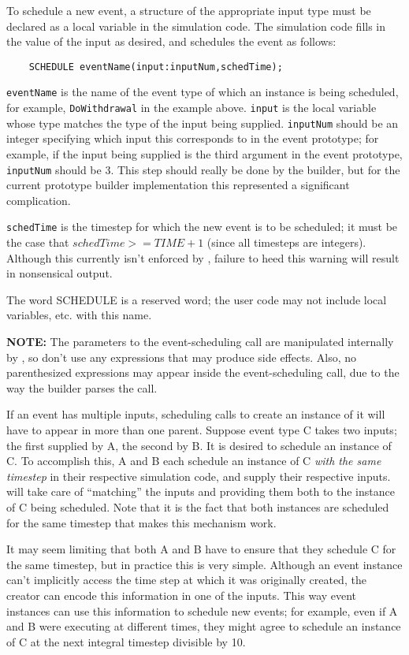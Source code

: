 To schedule a new event, a structure of the appropriate input type must
be declared as a local variable in the simulation code.  The simulation
code fills in the value of the input as desired, and schedules the event
as follows:

\begin{verbatim}
	SCHEDULE eventName(input:inputNum,schedTime);
\end{verbatim}

{\tt eventName} is the name of the event type of which an instance is
being scheduled, for example, {\tt DoWithdrawal} in the example above.
{\tt input} is the local variable whose type matches the type of the
input being supplied.  {\tt inputNum} should be an integer specifying
which input this corresponds to in the event prototype; for example, if
the input being supplied is the third argument in the event prototype,
{\tt inputNum} should be 3.  This step should really be done by the
builder, but for the current prototype builder implementation this
represented a significant complication.

 {\tt schedTime} is the timestep for which the new
event is to be scheduled; it must be the case that $schedTime>=TIME+1$
(since all timesteps are integers).  Although this currently isn't
enforced by \dispare, failure to heed this warning will result in
nonsensical output.

The word SCHEDULE is a reserved word; the user code may not include
local variables, etc. with this name.

{\bf NOTE:} The parameters to the event-scheduling call are manipulated
internally by \dispare, so don't use any expressions that may produce
side effects.  Also, no parenthesized expressions may appear inside the
event-scheduling call, due to the way the builder parses the call.

If an event has multiple inputs, scheduling calls to create an instance
of it will have to appear in more than one parent.  Suppose event type C
takes two inputs; the first supplied by A, the second by B.  It is
desired to schedule an instance of C.  To accomplish this, A and B each
schedule an instance of C {\em with the same timestep} in their
respective simulation code, and supply their respective inputs.
\dispare will take care of ``matching'' the inputs and providing them
both to the instance of C being scheduled.  Note that it is the fact
that both instances are scheduled for the same timestep that makes this
mechanism work.

It may seem limiting that both A and B have to ensure that they schedule
C for the same timestep, but in practice this is very simple.  Although
an event instance can't implicitly access the time step at which it was
originally created, the creator can encode this information in one of
the inputs.  This way event instances can use this information to
schedule new events; for example, even if A and B were executing at
different times, they might agree to schedule an instance of C at the
next integral timestep divisible by 10.  

